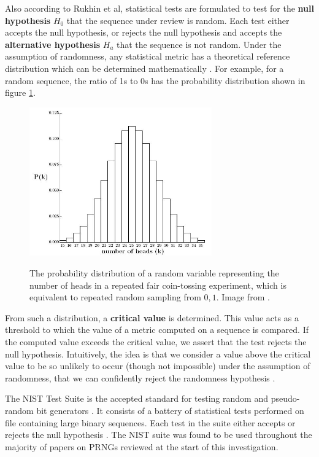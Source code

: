 \documentclass[12pt, titlepage]{report}
\theoremstyle{definition}
\begin{document}
Also according to Rukhin et al, statistical tests are formulated to test for the \textbf{null hypothesis} $H_0$ that the sequence under review is random. Each test either accepts the null hypothesis, or rejects the null hypothesis and accepts the \textbf{alternative hypothesis} $H_a$ that the sequence is not random. Under the assumption of randomness, any statistical metric has a theoretical reference distribution which can be determined mathematically \cite[p. 1.3]{rukhin2001statistical}. For example, for a random sequence, the ratio of 1s to 0s has the probability distribution shown in figure \ref{figure:distribution}.

\begin{figure}
\centering
\includegraphics[width=0.7\textwidth]{img/distribution.jpg}\\
\caption{The probability distribution of a random variable representing the number of heads in a repeated fair coin-tossing experiment, which is equivalent to repeated random sampling from ${0, 1}$. Image from \cite{terr2009math}.}
\label{figure:distribution}
\end{figure}
	
From such a distribution, a \textbf{critical value} is determined. This value acts as a threshold to which the value of a metric computed on a sequence is compared. If the computed value exceeds the critical value, we assert that the test rejects the null hypothesis. Intuitively, the idea is that we consider a value above the critical value to be so unlikely to occur (though not impossible) under the assumption of randomness, that we can confidently reject the randomness hypothesis \cite[p. 1.3]{rukhin2001statistical}.

The NIST Test Suite is the accepted standard for testing random and pseudo-random bit generators \cite{lavasani2009practical}. It consists of a battery of statistical tests performed on file containing large binary sequences. Each test in the suite either accepts or rejects the null hypothesis \cite{rukhin2001statistical}. The NIST suite was found to be used throughout the majority of papers on PRNGs reviewed at the start of this investigation.
\end{document}
